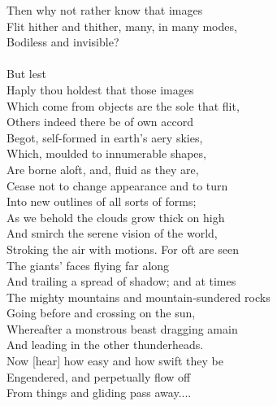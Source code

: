 Then why not rather know that images\\
Flit hither and thither, many, in many modes,\\
Bodiless and invisible?\\
\\
But lest\\
Haply thou holdest that those images\\
Which come from objects are the sole that flit,\\
Others indeed there be of own accord\\
Begot, self-formed in earth's aery skies,\\
Which, moulded to innumerable shapes,\\
Are borne aloft, and, fluid as they are,\\
Cease not to change appearance and to turn\\
Into new outlines of all sorts of forms;\\
As we behold the clouds grow thick on high\\
And smirch the serene vision of the world,\\
Stroking the air with motions. For oft are seen\\
The giants' faces flying far along\\
And trailing a spread of shadow; and at times\\
The mighty mountains and mountain-sundered rocks\\
Going before and crossing on the sun,\\
Whereafter a monstrous beast dragging amain\\
And leading in the other thunderheads.\\
Now [hear] how easy and how swift they be\\
Engendered, and perpetually flow off\\
From things and gliding pass away....

